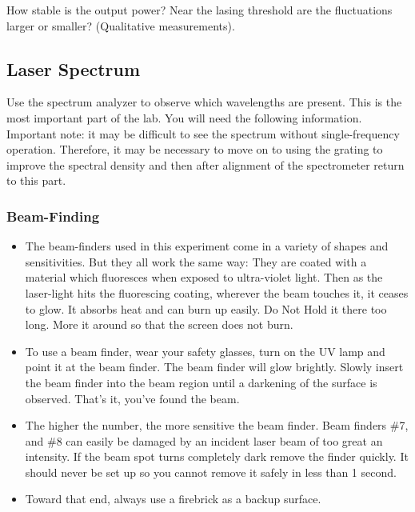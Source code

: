 \documentclass{../lab}
\begin{document}
How stable is the output power? Near the lasing threshold are the fluctuations larger or smaller? (Qualitative measurements).

\newpage

\subsection{Laser Spectrum}

Use the spectrum analyzer to observe which wavelengths are present. This is the most important part of the lab. You will need the following information. Important note: it may be difficult to see the spectrum without single-frequency operation. Therefore, it may be necessary to move on to using the grating to improve the spectral density and then after alignment of the spectrometer return to this part.

\subsubsection{Beam-Finding}

\begin{itemize}
    \item The beam-finders used in this experiment come in a variety of shapes and sensitivities. But they all work the same way: They are coated with a material which fluoresces when exposed to ultra-violet light. Then as the laser-light hits the fluorescing coating, wherever the beam touches it, it ceases to glow. It absorbs heat and can burn up easily. Do Not Hold it there too long. More it around so that the screen does not burn.

    \item To use a beam finder, wear your safety glasses, turn on the UV lamp and point it at the beam finder. The beam finder will glow brightly. Slowly insert the beam finder into the beam region until a darkening of the surface is observed. That's it, you've found the beam.

    \item The higher the number, the more sensitive the beam finder. Beam finders \#7, and \#8 can easily be damaged by an incident laser beam of too great an intensity. If the beam spot turns completely dark remove the finder quickly. It should never be set up so you cannot remove it safely in less than 1 second.

    \item Toward that end, always use a firebrick as a backup surface.
\end{itemize}
\end{document}
